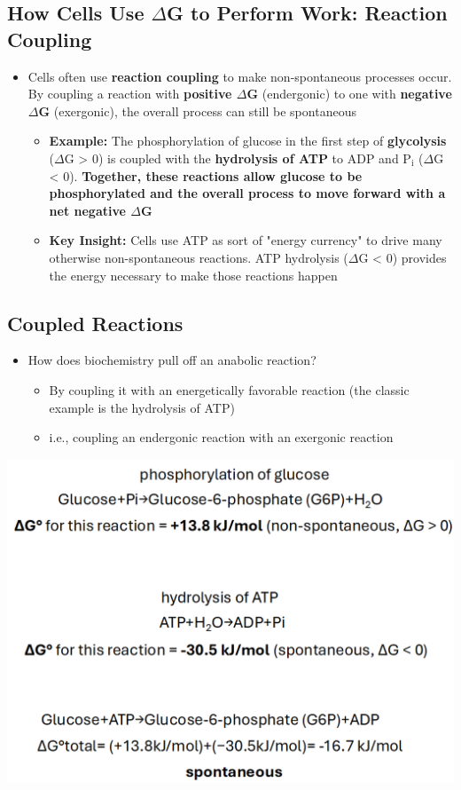 \documentclass[10pt]{article}
\begin{document}
\subsection*{How Cells Use $\Delta$G to Perform Work: Reaction Coupling}
\begin{itemize}
    \item Cells often use \textbf{reaction coupling} to make non-spontaneous processes occur.  By coupling a reaction with \textbf{positive $\Delta$G} (endergonic) to one with \textbf{negative $\Delta$G} (exergonic), the overall process can still be spontaneous
    \begin{itemize}
        \item \textbf{Example:} The phosphorylation of glucose in the first step of \textbf{glycolysis} ($\Delta$G > 0) is coupled with the \textbf{hydrolysis of ATP} to ADP and P$_\text{i}$ ($\Delta$G < 0).  \textbf{Together, these reactions allow glucose to be phosphorylated and the overall process to move forward with a net negative $\Delta$G}
        \item \textbf{Key Insight:} Cells use ATP as sort of "energy currency" to drive many otherwise non-spontaneous reactions.  ATP hydrolysis ($\Delta$G < 0) provides the energy necessary to make those reactions happen
    \end{itemize}
\end{itemize}

\subsection*{Coupled Reactions}
\begin{itemize}
    \item How does biochemistry pull off an anabolic reaction?
    \begin{itemize}
        \item By coupling it with an energetically favorable reaction (the classic example is the hydrolysis of ATP)
        \item i.e., coupling an endergonic reaction with an exergonic reaction
    \end{itemize}
\end{itemize}
\begin{center}
    \includegraphics[width=\textwidth]{L3_12.png}
\end{center}
\end{document}
